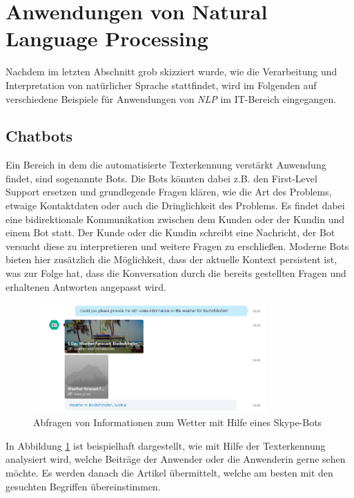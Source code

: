 \section{Anwendungen von Natural Language Processing}
Nachdem im letzten Abschnitt grob skizziert wurde, wie die Verarbeitung und Interpretation von natürlicher Sprache stattfindet, wird im Folgenden auf verschiedene Beispiele für Anwendungen von \textit{NLP} im IT-Bereich eingegangen.

\subsection{Chatbots}
Ein Bereich in dem die automatisierte Texterkennung verstärkt Anwendung findet, sind sogenannte Bots. Die Bots könnten dabei z.B. den First-Level Support ersetzen und grundlegende Fragen klären, wie die Art des Problems, etwaige Kontaktdaten oder auch die Dringlichkeit des Problems. Es findet dabei eine bidirektionale Kommunikation zwischen dem Kunden oder der Kundin und einem Bot statt. Der Kunde oder die Kundin schreibt eine Nachricht, der Bot versucht diese zu interpretieren und weitere Fragen zu erschließen. Moderne Bots bieten hier zusätzlich die Möglichkeit, dass der aktuelle Kontext persistent ist, was zur Folge hat, dass die Konversation durch die bereits gestellten Fragen und erhaltenen Antworten angepasst wird. 

\begin{figure}[ht]
	\centering
		\includegraphics[width=0.80\textwidth]{images/chatbot.PNG}
	\caption{Abfragen von Informationen zum Wetter mit Hilfe eines Skype-Bots}
	\label{fig:chatbot}
\end{figure}

In Abbildung \ref{fig:chatbot} ist beispielhaft dargestellt, wie mit Hilfe der Texterkennung analysiert wird, welche Beiträge der Anwender oder die Anwenderin gerne sehen möchte. Es werden danach die Artikel übermittelt, welche am besten mit den gesuchten Begriffen übereinstimmen. 

